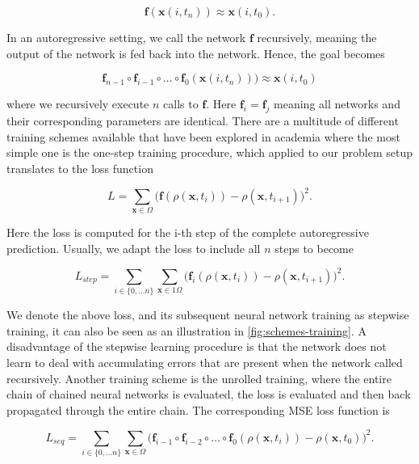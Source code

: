 \documentclass{article}
\begin{document}
\begin{equation}
\label{goal-2}
    \mathbf{f}(\mathbf{x}(i, t_{n})) \approx \mathbf{x}(i, t_{0}).
\end{equation}

In an autoregressive setting, we call the network $\mathbf{f}$ recursively, meaning the output of the network is fed back into the network. Hence, the goal becomes

\begin{equation}
\label{goal-rec}
    \mathbf{f}_{n-1} \circ \mathbf{f}_{i-1} \circ \dots \circ \mathbf{f}_0(\mathbf{x}(i, t_{n}))\bigr) \approx \mathbf{x}(i, t_{0})
\end{equation}

where we recursively execute $n$ calls to $\mathbf{f}$. Here $\mathbf{f}_i = \mathbf{f}_j$ meaning all networks and their corresponding parameters are identical. There are a multitude of different training schemes available that have been explored in academia where the most simple one is the one-step training procedure, which applied to our problem setup translates to the loss function 

\begin{equation}
    L = \sum_{\mathbf{x} \in  \Omega} \Biggl(\mathbf{f}(\rho(\mathbf{x}, t_{i})) - \rho(\mathbf{x}, t_{i+1})\Biggr)^2.
\end{equation}

Here the loss is computed for the i-th step of the complete autoregressive prediction. Usually, we adapt the loss to include all $n$ steps to become


\begin{equation}
\label{step}
    L_{step} = \sum_{i \in \{0, \dots n\}}\sum_{\mathbf{x} \in 1 \Omega} \Biggl(\mathbf{f}_i(\rho(\mathbf{x}, t_{i})) - \rho(\mathbf{x}, t_{i+1})\Biggr)^2.
\end{equation}

We denote the above loss, and its subsequent neural network training as stepwise training, it can also be seen as an illustration in \ref{fig:schemes-training}. A disadvantage of the stepwise learning procedure is that the network does not learn to deal with accumulating errors that are present when the network called recursively. Another training scheme is the unrolled training, where the entire chain of chained neural networks is evaluated, the loss is evaluated and then back propagated through the entire chain. The corresponding MSE loss function is 

\begin{equation}
\label{seq}
    L_{seq} = \sum_{i \in \{0, \dots n\}}\sum_{\mathbf{x} \in \Omega} \Biggl(\mathbf{f}_{i-1} \circ \mathbf{f}_{i-2} \circ \dots \circ \mathbf{f}_0 (\rho(\mathbf{x}, t_{i})) - \rho(\mathbf{x}, t_{0})\Biggr)^2.
\end{equation}
\end{document}
